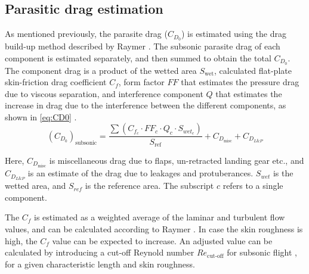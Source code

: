 \subsection{Parasitic drag estimation}
\label{subsec:parasitic_drag_estimation}
As mentioned previously, the parasite drag ($C_{D_0}$) is estimated using the drag build-up method described by Raymer \cite{raymer1992aircraft}. The subsonic parasite drag of each component is estimated separately, and then summed to obtain the total $C_{D_0}$. The component drag is a product of the wetted area $S_\text{wet}$, calculated flat-plate skin-friction drag coefficient $C_f$, form factor $FF$ that estimates the pressure drag due to viscous separation, and interference component $Q$ that estimates the increase in drag due to the interference between the different components, as shown in \autoref{eq:CD0} \cite[p. 281]{raymer1992aircraft}.
\begin{equation}
    (C_{D_0})_\text{subsonic} = \frac{\sum(C_{f_c} \cdot FF_c \cdot Q_c \cdot S_{wet_c})}{S_\text{ref}} + C_{D_\text{misc}} + C_{D_{L\&P}}
    \label{eq:CD0}
\end{equation}

Here, $C_{D_\text{misc}}$ is miscellaneous drag due to flaps, un-retracted landing gear etc., and $C_{D_{L\&P}}$ is an estimate of the drag due to leakages and protuberances. $S_{wet}$ is the wetted area, and $S_{ref}$ is the reference area. The subscript $c$ refers to a single component.

The $C_f$ is estimated as a weighted average of the laminar and turbulent flow values, and can be calculated according to Raymer  \cite[p. 282]{raymer1992aircraft}. In case the skin roughness is high, the $C_f$ value can be expected to increase. An adjusted value can be calculated by introducing a cut-off Reynold number $Re_\text{cut-off}$ for subsonic flight \cite[p. 282]{raymer1992aircraft}, for a given  characteristic length and skin roughness.

